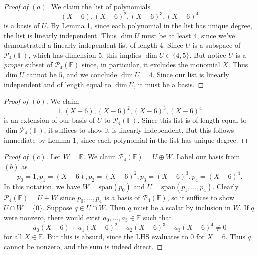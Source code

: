 \documentclass{extarticle}
\newcommand{\F}{\mathbb{F}}
\newcommand{\Span}{\mathrm{span}}
\begin{document}
\begin{proof}[Proof of $(a)$]
We claim the list of polynomials
\begin{equation*}
(X - 6), (X - 6)^2, (X - 6)^3, (X-6)^4
\end{equation*}
is a basis of $U$.  By Lemma 1, since each polynomial in the list has unique degree, the list is linearly independent.  Thus $\dim U$ must be at least $4$, since we've demonstrated a linearly independent list of length $4$.  Since $U$ is a subspace of $\mathcal{P}_4(\F)$, which has dimension $5$, this implies $\dim U\in\{4,5\}$.  But notice $U$ is a \emph{proper} subset of $\mathcal{P}_4(\F)$ since, in particular, it excludes the monomial $X$.  Thus $\dim U$ cannot be $5$, and we conclude $\dim U = 4$.  Since our list is linearly independent and of length equal to $\dim U$, it must be a basis.
\end{proof}
\begin{proof}[Proof of $(b)$]
We claim 
\begin{equation*}
1, (X - 6), (X - 6)^2, (X - 6)^3, (X-6)^4
\end{equation*}
is an extension of our basis of $U$ to $\mathcal{P}_4(\F)$.  Since this list is of length equal to $\dim\mathcal{P}_4(\F)$, it suffices to show it is linearly independent.  But this follows immediate by Lemma 1, since each polynomial in the list has unique degree.
\end{proof}
\begin{proof}[Proof of $(c)$]
Let $W = \F$.  We claim $\mathcal{P}_4(\F)=U\oplus W$.  Label our basis from $(b)$ as
\begin{equation*}
p_0=1, p_1=(X - 6), p_2=(X - 6)^2, p_3=(X - 6)^3, p_4=(X-6)^4.
\end{equation*}
In this notation, we have $W = \Span(p_0)$ and $U=\Span(p_1,\dots,p_4)$.  Clearly $\mathcal{P}_4(\F)=U+W$ since $p_0,\dots,p_4$ is a basis of $\mathcal{P}_4(\F)$, so it suffices to show $U\cap W = \{0\}$.  Suppose $q\in U\cap W$.  Then $q$ must be a scalar by inclusion in $W$.  If $q$ were nonzero, there would exist $a_0,\dots,a_3\in \F$ such that
\begin{equation*}
a_0(X-6) + a_1(X-6)^2 + a_2(X-6)^3 + a_3(X-6)^4 \neq 0
\end{equation*}
for all $X\in\F$.  But this is absurd, since the LHS evaluates to $0$ for $X=6$.  Thus $q$ cannot be nonzero, and the sum is indeed direct. 
\end{proof}
\end{document}
